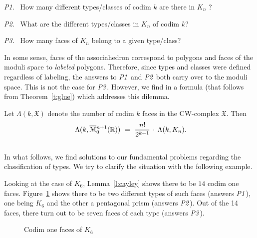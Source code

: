 \documentclass[10pt]{amsart}
\begin{document}
{\em P1.} \   How many different types/classes  of codim $k$ are there in $K_n$ ?
\vspace{.03in}

{\em P2.} \   What are the different types/classes in $K_n$ of codim $k$? 
\vspace{.03in}

{\em P3.} \  How many faces of $K_n$ belong to a given type/class?
\vspace{.1in}

In some sense, faces of the associahedron correspond to polygons and faces of the moduli space to {\em labeled} polygons.  Therefore, since types and classes were defined regardless of labeling, the answers to {\em P1}\, and {\em P2}\, both carry over to the moduli space. This is not the case for {\em P3}\,. However, we find in \cite{dev} a formula (that follows from Theorem~\ref{t:glue}) which addresses this dilemma.

\begin{prop} 
Let $\Lambda(k, {\mathfrak X})$ denote the number of codim $k$ faces in the CW-complex ${\mathfrak X}$. Then
$$\ \Lambda(k, \M{n+1})  \ = \ {\displaystyle \frac{n!}{2^{k+1}}} \, \cdot \, \Lambda(k, K_n).$$
\label{p:k-to-m}
\end{prop}


\subsection{}
In what follows, we find solutions to our fundamental problems regarding the classification of types. We try to clarify the situation with the following example.

\begin{exmp}
Looking at the case of $K_6$, Lemma~\ref{l:cayley} shows there to be $14$ codim one faces.  Figure~\ref{k6codim1} shows there to be two different types of such faces (answers {\em P1}\,), one being $K_6$ and the other a pentagonal prism (answers {\em P2}\,).  Out of the 14 faces, there turn out to be seven faces of each type (answers {\em P3}\,). 
\end{exmp}

\begin{figure} [h]
\caption{Codim one faces of $K_6$}
\label{k6codim1}
\end{figure}
\end{document}
